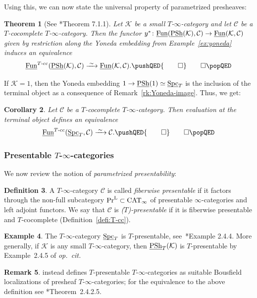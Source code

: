 \documentclass[reqno]{memo-l}
\theoremstyle{mythm}
\newtheorem{thm}{Theorem}[section]
\newtheorem{cor}[thm]{Corollary}
\theoremstyle{definition}
\newtheorem{rk}[thm]{Remark}
\newtheorem{ex}[thm]{Example}
\newtheorem{definition}[thm]{Definition}
\numberwithin{equation}{section}
\newcommand{\qednow}{\pushQED{\qed}\qedhere\popQED}
\newcommand{\Cc}{{\mathcal{C}}}
\newcommand{\Kk}{{\mathcal{K}}}
\DeclareMathOperator{\Spc}{Spc}
\DeclareMathOperator{\CAT}{CAT}
\newcommand{\PrL}{\textup{Pr}^{\textup{L}}}
\newcommand{\Fun}{{\textup{Fun}}}
\DeclareMathOperator{\PSh}{PSh}
\newcommand{\ulhelper}[2]{\underline{\setbox0=\hbox{$#1#2$}\dp0=0.4pt \box0\relax}}
\newcommand{\ul}[1]{{\mathpalette\ulhelper{#1}}\hbox{\rule[-2pt]{0pt}{0pt}}}
\newcommand{\iso}{\xrightarrow{\;\smash{\raisebox{-0.25ex}{\ensuremath{\scriptstyle\sim}}}\;}}
\begin{document}
Using this, we can now state the universal property of parametrized presheaves:

\begin{thm}[See \cite{martiniwolf2021limits}*{Theorem 7.1.1}]\label{thm:univ-prop-PSh}
    Let $\Kk$ be a small $T$-$\infty$-category and let $\Cc$ be a $T$-cocomplete $T$-$\infty$-category. Then the functor $y^*\colon\ul\Fun(\ul\PSh(\Kk),\Cc)\to\ul\Fun(\Kk,\Cc)$ given by restriction along the Yoneda embedding from Example~\ref{ex:yoneda} induces an equivalence 
    \[
        \ul\Fun^\textup{$T$-cc}(\ul\PSh(\Kk),\Cc)\iso\ul\Fun(\Kk,\Cc).\qednow
    \]
\end{thm}

If $\Kk=1$, then the Yoneda embedding $1\to\ul\PSh(1)\simeq\ul\Spc_T$ is the inclusion of the terminal object as a consequence of Remark~\ref{rk:Yoneda-image}. Thus, we get:

\begin{cor}\label{cor:univ-prop-Spc-T}
    Let $\Cc$ be a $T$-cocomplete $T$-$\infty$-category. Then evaluation at the terminal object defines an equivalence
    \[
        \ul\Fun^\textup{$T$-cc}(\ul\Spc_T,\Cc)\iso\Cc.\qednow
    \]
\end{cor}

\subsubsection{Presentable $T$-$\infty$-categories} We now review the notion of \emph{parametrized presentability}:
\begin{definition}
    A $T$-$\infty$-category $\Cc$ is called \emph{fiberwise presentable} if it factors through the non-full subcategory $\PrL\subset\CAT_\infty$ of presentable $\infty$-categories and left adjoint functors. We say that $\Cc$ is \emph{(\kern1pt$T$)-presentable} if it is fiberwise presentable and $T$-cocomplete (Definition~\ref{defi:T-cc}).
\end{definition}

\begin{ex}
    The $T$-$\infty$-category $\ul\Spc_T$ is $T$-presentable, see~\cite{CLL_Global}*{Example 2.4.4}. More generally, if $\Kk$ is any small $T$-$\infty$-category, then $\ul\PSh_T(\Kk)$ is $T$-presentable by Example~2.4.5 of \emph{op.\ cit.}
\end{ex}

\begin{rk}
    \cite{martiniwolf2022presentable} instead defines $T$-presentable $T$-$\infty$-categories as suitable Bousfield localizations of presheaf $T$-$\infty$-categories; for the equivalence to the above definition see \cite{martiniwolf2022presentable}*{Theorem~2.4.2.5}.
\end{rk}
\end{document}
